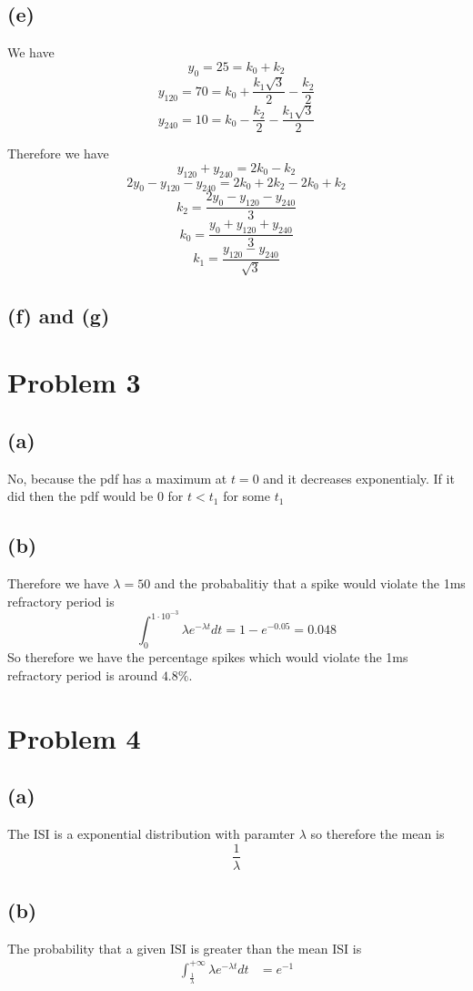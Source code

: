 \documentclass[12pt]{article}
\begin{document}
\subsection*{(e)}
We have
$$y_0=25=k_0+k_2$$
$$y_{120}=70=k_0+\frac{k_1\sqrt{3}}{2}-\frac{k_2}{2}$$
$$y_{240}=10=k_0-\frac{k_2}{2}-\frac{k_1\sqrt{3}}{2}$$

Therefore we have
$$y_{120}+y_{240}=2k_0-k_2$$
$$2y_0-y_{120}-y_{240}=2k_0+2k_2-2k_0+k_2$$
$$k_2=\boxed{\frac{2y_0-y_{120}-y_{240}}{3}}$$
$$k_0=\boxed{\frac{y_0+y_{120}+y_{240}}{3}}$$
$$k_1=\boxed{\frac{y_{120}-y_{240}}{\sqrt{3}}}$$
\subsection*{(f) and (g)}


\section*{Problem 3}
\subsection*{(a)}
No, because the pdf has a maximum at $t=0$ and it decreases exponentialy. If it did then the pdf would be 0 for $t<t_1$ for some $t_1$
\subsection*{(b)}
Therefore we have $\lambda=50$
and the probabalitiy that a spike would violate the 1ms refractory period is 
$$\int_{0}^{1\cdot10^{-3}}\lambda e^{-\lambda t}dt=1- e^{-0.05}=0.048$$
So therefore we have the percentage spikes which would violate the 1ms refractory period
is around $\boxed{4.8\%}$.
\section*{Problem 4}
\subsection*{(a)}
The ISI is a exponential distribution with paramter $\lambda$ so therefore the mean is
$$\frac{1}{\lambda}$$
\subsection*{(b)}
The probability that a given ISI is greater than the mean ISI is 
\begin{align*}
    \int_{\frac{1}{\lambda}}^{+\infty}\lambda e^{-\lambda t}dt&=\boxed{e^{-1}}
\end{align*}
\end{document}
